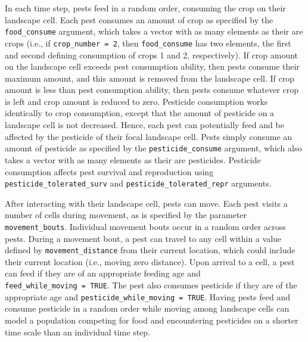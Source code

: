 \documentclass[10pt,letterpaper]{article}
\begin{document}
In each time step, pests feed in a random order, consuming the crop on their landscape cell. Each pest consumes an amount of crop as specified by the \texttt{food\_consume} argument, which takes a vector with as many elements as their are crops (i.e., if \texttt{crop\_number\ =\ 2}, then \texttt{food\_consume} has two elements, the first and second defining consumption of crops 1 and 2, respectively).
If crop amount on the landscape cell exceeds pest consumption ability, then pests consume their maximum amount, and this amount is removed from the landscape cell.
If crop amount is less than pest consumption ability, then pests consume whatever crop is left and crop amount is reduced to zero.
Pesticide consumption works identically to crop consumption, except that the amount of pesticide on a landscape cell is not decreased.
Hence, each pest can potentially feed and be affected by the pesticide of their focal landscape cell.
Pests simply consume an amount of pesticide as specified by the \texttt{pesticide\_consume} argument, which also takes a vector with as many elements as their are pesticides.
Pesticide consumption affects pest survival and reproduction using \texttt{pesticide\_tolerated\_surv} and \texttt{pesticide\_tolerated\_repr} arguments.

After interacting with their landscape cell, pests can move.
Each pest visits a number of cells during movement, as is specified by the parameter \texttt{movement\_bouts}.
Individual movement bouts occur in a random order across pests.
During a movement bout, a pest can travel to any cell within a value defined by \texttt{movement\_distance} from their current location, which could include their current location (i.e., moving zero distance).
Upon arrival to a cell, a pest can feed if they are of an appropriate feeding age and \texttt{feed\_while\_moving\ =\ TRUE}.
The pest also consumes pesticide if they are of the appropriate age and \texttt{pesticide\_while\_moving\ =\ TRUE}.
Having pests feed and consume pesticide in a random order while moving among landscape cells can model a population competing for food and encountering pesticides on a shorter time scale than an individual time step.
\end{document}
